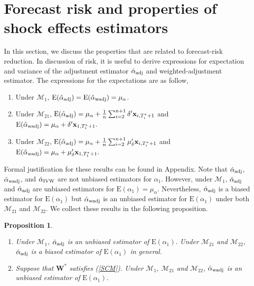 \documentclass[11pt]{article}
\def\mbf#1{\mathbf{#1}} %
\def\mc#1{\mathcal{#1}} %
\def\E#1{\mathrm{E}(#1)} %
\newtheorem{prop}{Proposition}
\theoremstyle{definition}
\begin{document}
\section{Forecast risk and properties of shock effects estimators}
\label{properties}

In this section, we discuss the properties that are related to forecast-risk reduction. In discussion of risk, it is useful to derive expressions for expectation and variance of the adjustment estimator $\hat{\alpha}_{\rm adj}$ and weighted-adjustment estimator.  The expressions for the expectations are as follow,

 \begin{enumerate}[label = (\roman*)]
    \item Under $\mc{M}_{1}$, $\E{\hat{\alpha}_{\rm adj}}=\E{\hat{\alpha}_{\rm wadj}} = \mu_{\alpha}$.
    \item Under $\mc{M}_{21}$, 
    $
      \E{\hat{\alpha}_{\rm adj}} = \mu_{\alpha} + \frac{1}{n} \sum_{i=2}^{n+1} \delta' \mbf{x}_{i, T_i^*+1}
    $
    and
    $
       \E{\hat{\alpha}_{\rm wadj}} = \mu_{\alpha} + \delta'\mbf{x}_{1, T_1^*+1} .
    $
    \item Under $\mc{M}_{22}$,
    $
      \E{\hat{\alpha}_{\rm adj}} = \mu_{\alpha} + \frac{1}{n} \sum_{i=2}^{n+1} \mu_{\delta}' \mbf{x}_{i, T_i^*+1}
    $
    and
    $
       \E{\hat{\alpha}_{\rm wadj}} = \mu_{\alpha} + \mu_{\delta}'\mbf{x}_{1, T_1^*+1} .
    $
  \end{enumerate}
Formal justification for these results can be found in Appendix. Note that $\hat{\alpha}_{\rm adj}$, $\hat{\alpha}_{\rm wadj}$, and $\hat{\alpha}_{\rm IVW}$ are not unbiased estimators for $\alpha_1$. However, under $\mc{M}_{1}$, $\hat{\alpha}_{\rm adj}$ and $\hat{\alpha}_{\rm adj}$ are unbiased estimators for $\E{\alpha_1}=\mu_{\alpha}$. Nevertheless, $\hat{\alpha}_{\rm adj}$ is a biased estimator for $\E{\alpha_1}$ but $\hat{\alpha}_{\rm wadj}$ is an unbiased estimator for $\E{\alpha_1}$ under both $\mc{M}_{21}$ and $\mc{M}_{22}$. We collect these results in the following proposition. 

\begin{prop}
\label{unbiased} 
\quad 
\begin{enumerate}[label = (\roman*)]
  \item Under $\mc{M}_1$, $\hat{\alpha}_{\rm adj}$ is an unbiased estimator of $\E{\alpha_1}$. Under $\mc{M}_{21}$ and $\mc{M}_{22}$, $\hat{\alpha}_{\rm adj}$ is a biased estimator of $\E{\alpha_1}$ in general.
  \item Suppose that $\mbf{W}^*$ satisfies (\ref{SCM}). Under $\mc{M}_{1}$, $\mc{M}_{21}$ and $\mc{M}_{22}$, $\hat{\alpha}_{\rm wadj}$ is an unbiased estimator of $\E{\alpha_1}$.
\end{enumerate}
\end{prop}
\end{document}
